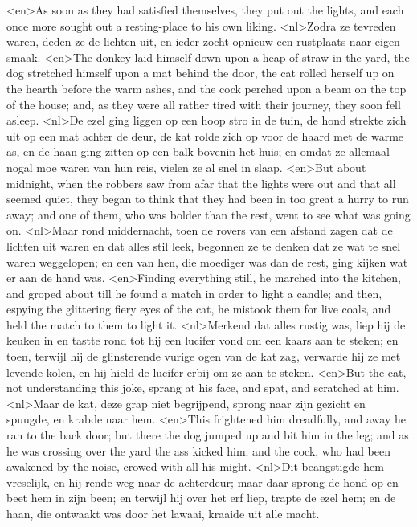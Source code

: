 <en>As soon as they had satisfied themselves, they put out the lights, and each once more sought out a resting-place to his own liking.
<nl>Zodra ze tevreden waren, deden ze de lichten uit, en ieder zocht opnieuw   een rustplaats naar eigen smaak.
<en>The donkey laid himself down upon a heap of straw in the yard, the dog stretched himself upon a mat behind the door, the cat rolled herself up on the hearth before the warm ashes, and the cock perched upon a beam on the top of the house; and, as they were all rather tired with their journey, they soon fell asleep.
<nl>De ezel ging liggen op een hoop stro in de tuin, de hond strekte zich uit op een mat achter de deur, de kat rolde zich op voor de haard met de warme as, en de haan ging zitten op een balk bovenin het huis; en omdat ze allemaal nogal moe waren van hun reis, vielen ze al snel in slaap.
<en>But about midnight, when the robbers saw from afar that the lights were out and that all seemed quiet, they began to think that they had been in too great a hurry to run away; and one of them, who was bolder than the rest, went to see what was going on.
<nl>Maar rond middernacht, toen de rovers van een afstand zagen dat de lichten uit waren en dat alles stil leek, begonnen ze te denken dat ze wat te snel waren weggelopen; en een van hen, die moediger was dan de rest, ging kijken wat er aan de hand was.
<en>Finding everything still, he marched into the kitchen, and groped about till he found a match in order to light a candle; and then, espying the glittering fiery eyes of the cat, he mistook them for live coals, and held the match to them to light it.
<nl>Merkend dat alles rustig was, liep hij de keuken in en tastte rond tot hij een lucifer vond om een kaars aan te steken; en toen, terwijl hij de glinsterende vurige ogen van de kat zag, verwarde hij ze met levende kolen, en hij hield de lucifer erbij om ze aan te steken.
<en>But the cat, not understanding this joke, sprang at his face, and spat, and scratched at him.
<nl>Maar de kat, deze grap niet begrijpend, sprong naar zijn gezicht en spuugde, en krabde naar hem.
<en>This frightened him dreadfully, and away he ran to the back door; but there the dog jumped up and bit him in the leg; and as he was crossing over the yard the ass kicked him; and the cock, who had been awakened by the noise, crowed with all his might.
<nl>Dit beangstigde hem vreselijk, en hij rende weg  naar de achterdeur; maar daar sprong de hond op en beet hem in zijn been; en terwijl hij over het erf liep, trapte de ezel hem; en de haan, die ontwaakt was door het lawaai, kraaide uit alle macht.
